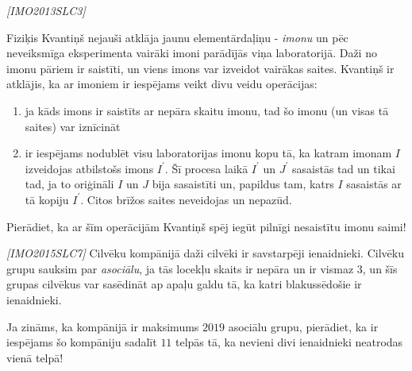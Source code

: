 \begin{problem}
\textit{[IMO2013SLC3]}

Fiziķis Kvantiņš nejauši atklāja jaunu elementārdaļiņu - \textit{imonu} un pēc neveiksmīga eksperimenta vairāki imoni parādījās viņa laboratorijā. Daži no imonu pāriem ir saistīti, un viens imons var izveidot vairākas saites. Kvantiņš ir atklājis, ka ar imoniem ir iespējams veikt divu veidu operācijas:
\begin{enumerate}
\item ja kāds imons ir saistīts ar nepāra skaitu imonu, tad šo imonu (un visas tā saites) var iznīcināt
\item ir iespējams nodublēt visu laboratorijas imonu kopu tā, ka katram imonam $I$ izveidojas atbilstošs imons $I^\prime$. Šī procesa laikā $I^\prime$ un $J^\prime$ sasaistās tad un tikai tad, ja to oriģināli $I$ un $J$ bija sasaistīti un, papildus tam, katrs $I$ sasaistās ar tā kopiju $I^\prime$. Citos brīžos saites neveidojas un nepazūd.
\end{enumerate}

Pierādiet, ka ar šīm operācijām Kvantiņš spēj iegūt pilnīgi nesaistītu imonu saimi!

\end{problem}
%

\begin{problem}
\textit{[IMO2015SLC7]}
Cilvēku kompānijā daži cilvēki ir savstarpēji ienaidnieki. Cilvēku grupu sauksim par \textit{asociālu}, ja tās locekļu skaits ir nepāra un ir vismaz $3$, un šīs grupas cilvēkus var sasēdināt ap apaļu galdu tā, ka katri blakussēdošie ir ienaidnieki.

Ja zināms, ka kompānijā ir maksimums $2019$ asociālu grupu, pierādiet, ka ir iespējams šo kompāniju sadalīt $11$ telpās tā, ka nevieni divi ienaidnieki neatrodas vienā telpā!
\end{problem}
%


